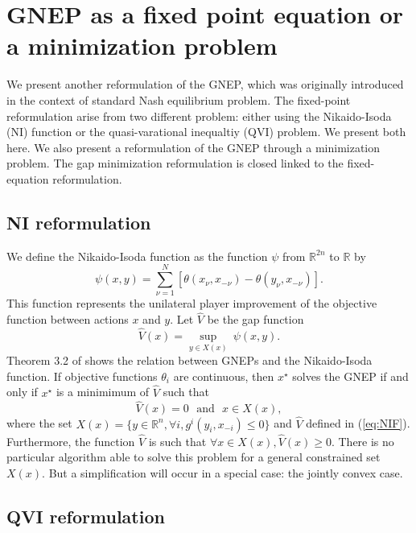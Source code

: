 \documentclass[11pt, a4paper]{article}
\newcommand{\txtm}[1]{\textrm{~~#1~~}}
\newcommand{\R}{\ensuremath{\mathbb{R}}}
\begin{document}
\section{GNEP as a fixed point equation or a minimization problem}

We present another reformulation of the GNEP, which was originally introduced in the context of standard Nash equilibrium problem. 
The fixed-point reformulation arise from two different problem: either using the Nikaido-Isoda (NI) function
 or the quasi-varational inequaltiy (QVI) problem. We present both here.
We also present a reformulation of the GNEP through a minimization problem.
The gap minimization reformulation is closed linked to the fixed-equation reformulation.



\subsection{NI reformulation}

We define the Nikaido-Isoda function as the function $\psi$ from $\R^{2n}$ to  $\R$ by
\begin{equation}
\psi(x, y) = \sum_{\nu = 1}^N [ \theta(x_\nu, x_{-\nu}) -  \theta(y_\nu, x_{-\nu}) ].
\label{eq:NIF}
\end{equation}
This function represents the unilateral player  improvement of the objective function between actions $x$ and $y$. 
Let $\hat V$ be the gap function 
$$
\hat V(x) = \underset{ y \in X(x) }{\sup}~ \psi(x,y).
$$
Theorem 3.2 of \cite{facchkanz09b} shows the relation between GNEPs and the Nikaido-Isoda function. 
If objective functions $\theta_i$ are continuous, then  $x^\star$ solves the GNEP if and only if $x^\star$ 
is a minimimum of $\hat V$ such that
\begin{equation}
\hat V(x) = 0
\txtm{and} 
x \in X(x),
\label{eq:NIF:general}
\end{equation}
where the set $X(x) = \{y \in \R^n, \forall i, g^i(y_i, x_{-i}) \leq 0 \}$ and $\hat V$ defined in (\ref{eq:NIF}). Furthermore, the function $\hat V$ is such that $\forall x \in X(x), \hat V(x) \geq 0$.
There is no particular algorithm able to solve this problem for a general constrained set $X(x)$. But a simplification will occur in a special case: the jointly convex case.

\subsection{QVI reformulation}
\end{document}
